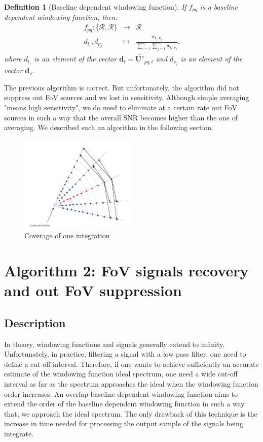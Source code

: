 \documentclass[useAMS,usenatbib]{mn2e}
\newtheorem{definition}[theorem]{Definition}
\begin{document}
\begin{definition}[Baseline dependent windowing function]
\label{def:3}
If $f_{pq}$ is a \textit{baseline dependent windowing function}, then:
\begin{eqnarray*}
 f_{pq}: \{\mathbf{\mathcal{R}},\mathbf{\mathcal{R}}\} &\rightarrow& \mathbf{\mathcal{R}}\\
                   d_{t_i},d_{\nu_j} &\mapsto& \frac{w_{t_i,\nu_j}}{\sum_{i=1}^{n_t}\sum_{j=1}^{n_{\nu}}w_{t_i,\nu_j}}.
\end{eqnarray*}
where $d_{t_i}$ is an element of the vector $\mathbf{d}_{t}=\overline{\overline{\mathbf{U}^{s}}}_{pq,t}$ and $d_{\nu_j}$ is an element 
of the vector $\mathbf{d}^{}_{\nu}$.
\end{definition}
The previous algorithm is correct. But unfortunately, the algorithm did not suppress out FoV sources and we lost  in sensitivity. 
Although simple averaging "means high sensitivity", we do need to eliminate at a certain rate out FoV sources in such a way that the 
overall SNR becomes higher than the one of averaging. We described such an algorithm in the following section.
\begin{figure}
  \centering
    \includegraphics[width=0.5\textwidth]{./Figures/uvcov.png}
    \caption{Coverage of one integration}\label{fig:uvcov}
\end{figure}
\section{Algorithm 2: FoV signals recovery and out FoV suppression}
\label{baseline2}
\subsection{Description}
In theory, windowing functions and signals generally extend to  infinity. Unfortunately, in practice, filtering a signal with a low pass 
filter, one need to define a cut-off interval. Therefore, if one  wants to achieve sufficiently an accurate  estimate of the 
windowing function ideal spectrum, one need a wide cut-off interval as far as the spectrum approaches the ideal when the windowing function 
order increases. An overlap baseline dependent windowing function aims to extend the order of the baseline dependent windowing function in 
such a way that, we approach the ideal spectrum.
The only drawback of this technique is the increase in time needed for processing the output sample of the signals being integrate.  
\end{document}

